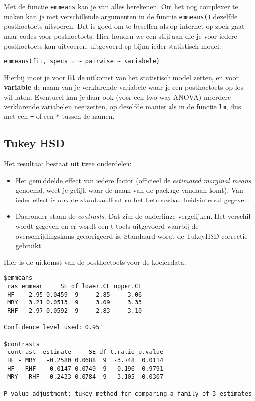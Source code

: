\documentclass[
  letterpaper,
  DIV=11,
  numbers=noendperiod]{scrreprt}
\providecommand{\tightlist}{%
  \setlength{\itemsep}{0pt}\setlength{\parskip}{0pt}}\usepackage{longtable,booktabs,array}
\theoremstyle{definition}
\theoremstyle{remark}
\begin{document}
Met de functie \texttt{emmeans} kan je van alles berekenen. Om het nog
complexer te maken kan je met verschillende argumenten in de functie
\texttt{emmeans()} dezelfde posthoctoets uitvoeren. Dat is goed om te
beseffen als op internet op zoek gaat naar codes voor posthoctoets. Hier
houden we een stijl aan die je voor iedere posthoctoets kan uitvoeren,
uitgevoerd op bijna ieder statistisch model:

\texttt{emmeans(fit,\ specs\ =\ \textasciitilde{}\ pairwise\ \textasciitilde{}\ variabele)}

Hierbij moet je voor \textbf{fit} de uitkomst van het statistisch model
zetten, en voor \textbf{variable} de naam van je verklarende variabele
waar je een posthoctoets op los wil laten. Eventueel kan je daar ook
(voor een two-way-ANOVA) meerdere verklarende variabelen neerzetten, op
dezelfde manier als in de functie \texttt{lm}, dus met een \texttt{+} of
een \texttt{*} tussen de namen.

\hypertarget{tukey-hsd}{%
\subsection{Tukey HSD}\label{tukey-hsd}}

Het resultaat bestaat uit twee onderdelen:

\begin{itemize}
\tightlist
\item
  Het gemiddelde effect van iedere factor (officieel de \emph{estimated
  marginal means} genoemd, weet je gelijk waar de naam van de package
  vandaan komt). Van ieder effect is ook de standaardfout en het
  betrouwbaarheidsinterval gegeven.
\item
  Daaronder staan de \emph{contrasts}. Dat zijn de onderlinge
  vergelijken. Het verschil wordt gegeven en er wordt een t-toets
  uitgevoerd waarbij de overschrijdingskans gecorrigeerd is. Standaard
  wordt de TukeyHSD-correctie gebruikt.
\end{itemize}

Hier is de uitkomst van de posthoctoets voor de koeiendata:

\begin{verbatim}
$emmeans
 ras emmean     SE df lower.CL upper.CL
 HF    2.95 0.0459  9     2.85     3.06
 MRY   3.21 0.0513  9     3.09     3.33
 RHF   2.97 0.0592  9     2.83     3.10

Confidence level used: 0.95 

$contrasts
 contrast  estimate     SE df t.ratio p.value
 HF - MRY   -0.2580 0.0688  9  -3.748  0.0114
 HF - RHF   -0.0147 0.0749  9  -0.196  0.9791
 MRY - RHF   0.2433 0.0784  9   3.105  0.0307

P value adjustment: tukey method for comparing a family of 3 estimates 
\end{verbatim}
\end{document}
